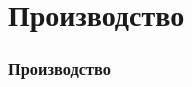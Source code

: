 \section{Производство}

\begin{frame}
    \frametitle{Производство}
    \begin{center}
    
    \end{center}
\end{frame}